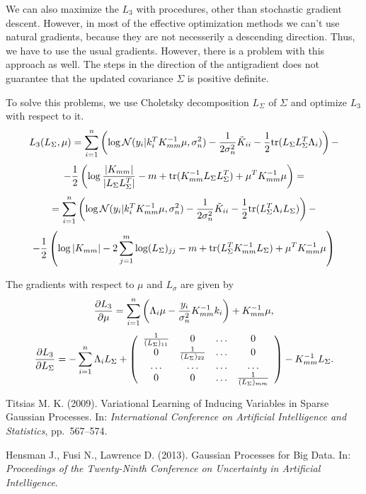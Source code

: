 \documentclass[12pt]{article}
\begin{document}
		We can also maximize the $L_3$ with procedures, other than stochastic gradient descent. However, in most of the effective optimization methods we can't use natural gradients, because they are not necesserily a descending direction. Thus, we have to use the usual gradients. However, there is a problem with this approach as well. The steps in the direction of the antigradient does not guarantee that the updated covariance $\Sigma$ is positive definite. 

		To solve this problems, we use Choletsky decomposition $L_{\Sigma}$ of $\Sigma$ and optimize $L_3$ with respect to it.
		$$L_3(L_{\Sigma}, \mu) = \sum_{i = 1}^{n} \left( \log \mathcal{N}(y_i | k_i^T K_{mm}^{-1} \mu, \sigma_n^2) - \frac 1 {2 \sigma_n^2} \tilde K_{ii} - \frac 1 2 \mbox{tr} (L_{\Sigma} L_{\Sigma}^T \Lambda_i) \right) - $$
		$$ -\frac 1 2 \left (\log \frac {|K_{mm}|} {|L_{\Sigma} L_{\Sigma}^T|} - m + \mbox{tr}(K_{mm}^{-1} L_{\Sigma} L_{\Sigma}^T) + \mu^T K_{mm}^{-1} \mu \right) = $$
		$$ = \sum_{i = 1}^{n} \left( \log \mathcal{N}(y_i | k_i^T K_{mm}^{-1} \mu, \sigma_n^2) - \frac 1 {2 \sigma_n^2} \tilde K_{ii} - \frac 1 2 \mbox{tr} (L_{\Sigma}^T \Lambda_iL_{\Sigma}) \right) - $$
		$$ -\frac 1 2 \left (\log |K_{mm}| - 2 \sum_{j=1}^{m}\log (L_{\Sigma})_{jj} - m + \mbox{tr}(L_{\Sigma}^T K_{mm}^{-1} L_{\Sigma}) + \mu^T K_{mm}^{-1} \mu \right)$$

		The gradients with respect to $\mu$ and $L_{\sigma}$ are given by
		$$
		\frac{\partial L_3}{\partial \mu} =  \sum_{i=1}^n \left(\Lambda_i \mu - \frac {y_i}{\sigma_n^2} K_{mm}^{-1} k_i \right) + K_{mm}^{-1} \mu,
		$$
		$$\frac{\partial L_3}{\partial L_{\Sigma}} = - \sum_{i=1}^n \Lambda_i L_{\Sigma} +
		\left(
		\begin{array}{cccc}
		\frac 1 {(L_{\Sigma})_{11}} & 0 & \ldots & 0\\
		0 & \frac 1 {(L_{\Sigma})_{22}} & \ldots & 0\\
		\ldots & \ldots & \ldots & \ldots\\
		0 & 0 & \ldots & \frac 1 {(L_{\Sigma})_{mm}} \\
		\end{array}   
		\right) 
		- K_{mm}^{-1} L_{\Sigma}.
		$$

\pagebreak
\begin{thebibliography}{99}

Titsias M. K. (2009).  Variational Learning of Inducing Variables in Sparse Gaussian
Processes.  In: {\it International Conference on Artificial Intelligence and Statistics}, pp.~567–574.

Hensman J., Fusi N., Lawrence D. (2013).  Gaussian Processes for Big Data.  In: {\it Proceedings of the Twenty-Ninth Conference on Uncertainty in Artificial Intelligence}.

\end{thebibliography}	
\end{document}
